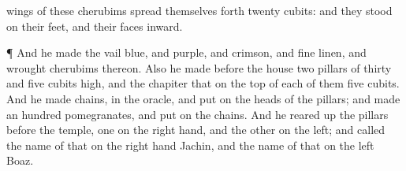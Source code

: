 {wings of these
cherubims spread themselves
forth
twenty
cubits: and they
stood on their
feet, and their
faces
{}
inward.
\par }{\PP {}¶ And he
made the
vail
{}
blue, and
purple, and
crimson, and fine
linen, and
wrought
cherubims thereon.
Also he
made
before the
house
two
pillars of
thirty and
five
cubits
high, and the
chapiter that
{} on the
top of each of them
{}
five
cubits.
And he
made
chains,
{} in the
oracle, and
put
{} on the
heads of the
pillars; and
made an
hundred
pomegranates, and
put
{} on the
chains.
And he reared
up the
pillars
before the
temple,
one on the right
hand, and the
other on the
left; and
called the
name of that on the right
hand
Jachin, and the
name of that on the
left
Boaz.

}
